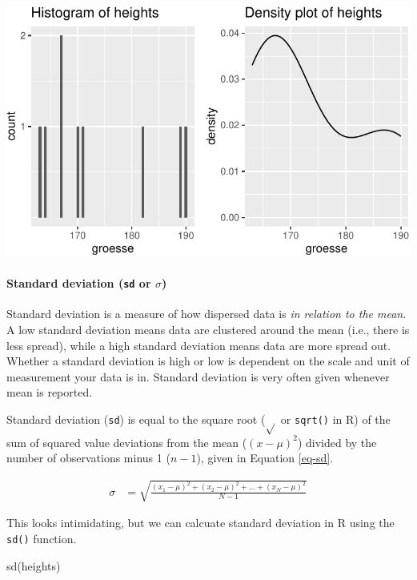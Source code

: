 \documentclass[
  letterpaper,
  DIV=11,
  numbers=noendperiod]{scrartcl}
\let\oldparagraph\paragraph
\renewcommand{\paragraph}[1]{\oldparagraph{#1}\mbox{}}
\newenvironment{Shaded}{\begin{snugshade}}{\end{snugshade}}
\newcommand{\FunctionTok}[1]{\textcolor[rgb]{0.28,0.35,0.67}{#1}}
\newcommand{\NormalTok}[1]{\textcolor[rgb]{0.00,0.23,0.31}{#1}}
\begin{document}
\includegraphics{08-desc_stats_en_files/figure-pdf/unnamed-chunk-27-1.pdf}

\hypertarget{standard-deviation-sd-or-sigma}{%
\paragraph{\texorpdfstring{Standard deviation (\texttt{sd} or
\(\sigma\))}{Standard deviation (sd or \textbackslash sigma)}}\label{standard-deviation-sd-or-sigma}}

Standard deviation is a measure of how dispersed data is \emph{in
relation to the mean}. A low standard deviation means data are clustered
around the mean (i.e., there is less spread), while a high standard
deviation means data are more spread out. Whether a standard deviation
is high or low is dependent on the scale and unit of measurement your
data is in. Standard deviation is very often given whenever mean is
reported.

Standard deviation (\texttt{sd}) is equal to the square root
(\(\sqrt{}\) or \texttt{sqrt()} in R) of the sum of squared value
deviations from the mean (\((x - \mu)^2\)) divided by the number of
observations minus 1 (\(n-1\)), given in Equation \ref{eq-sd}.

\begin{align}
\sigma & = \sqrt{\frac{(x_1-\mu)^2 + (x_2-\mu)^2 + ... + (x_N-\mu)^2}{N-1}} \label{eq-sd}
\end{align}

This looks intimidating, but we can calcuate standard deviation in R
using the \texttt{sd()} function.

\begin{Shaded}
\begin{Highlighting}[]
\FunctionTok{sd}\NormalTok{(heights)}
\end{Highlighting}
\end{Shaded}
\end{document}
